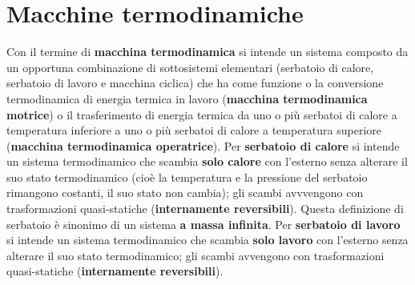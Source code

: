 \section{Macchine termodinamiche}
Con il termine di \textbf{macchina termodinamica} si intende un sistema composto da un opportuna
combinazione di sottosistemi elementari (serbatoio di calore, serbatoio di lavoro e macchina
ciclica) che ha come funzione o la conversione termodinamica di energia termica in lavoro
(\textbf{macchina termodinamica motrice}) o il trasferimento di energia termica da uno o più serbatoi
di calore a temperatura inferiore a uno o più serbatoi di calore a temperatura superiore
(\textbf{macchina termodinamica operatrice}). \newline
\newline
Per \textbf{serbatoio di calore} si intende un sistema termodinamico che scambia \textbf{solo calore} con l'esterno senza alterare il suo stato termodinamico (cioè la temperatura e la pressione del serbatoio rimangono costanti, il suo stato non cambia); gli scambi avvvengono con trasformazioni quasi-statiche (\textbf{internamente reversibili}). Questa definizione di serbatoio è sinonimo di un sistema \textbf{a massa infinita}.\newline
\newline
Per \textbf{serbatoio di lavoro} si intende un sistema termodinamico che scambia \textbf{solo lavoro} con l'esterno senza alterare il suo stato termodinamico; gli scambi avvengono con trasformazioni quasi-statiche (\textbf{internamente reversibili}).
